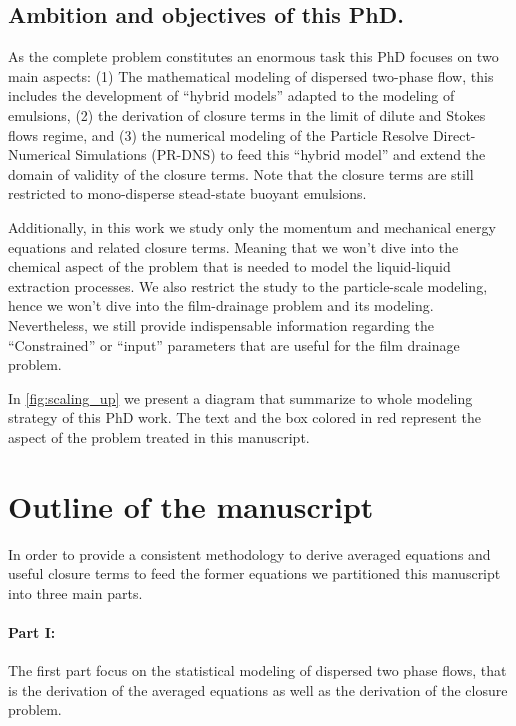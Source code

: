 \subsection{Ambition and objectives of this PhD.}




As the complete problem constitutes an enormous task this PhD focuses on two main aspects: 
(1) The mathematical modeling of dispersed two-phase flow, this includes the development of ``hybrid models'' adapted to the modeling of emulsions, 
(2) the derivation of closure terms in the limit of dilute and Stokes flows regime,  
and (3) the numerical modeling of the Particle Resolve Direct-Numerical Simulations (PR-DNS) to feed this ``hybrid model'' and extend the domain of validity of the closure terms. 
Note that the closure terms are still restricted to mono-disperse stead-state buoyant emulsions. 

Additionally, in this work we study only the momentum and mechanical energy equations and related closure terms. 
Meaning that we won't dive into the chemical aspect of the problem that is needed to model the liquid-liquid extraction processes. 
We also restrict the study to the particle-scale modeling, hence we won't dive into the film-drainage problem and its modeling.   
Nevertheless, we still provide indispensable information regarding the ``Constrained'' or ``input'' parameters that are useful for the film drainage problem. 

In \ref{fig:scaling_up} we present a diagram that summarize to whole modeling strategy of this PhD work. 
The text and the box colored in red represent the aspect of the problem treated in this manuscript. 


\section{Outline of the manuscript}


In order to provide a consistent methodology to derive averaged equations and useful closure terms to feed the former equations we partitioned this manuscript into three main parts. 

\paragraph*{Part I:} 
The first part focus on the statistical modeling of dispersed two phase flows, that is the derivation of the averaged equations as well as the derivation of the closure problem. 

